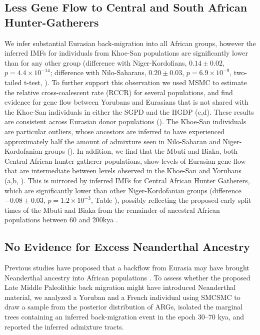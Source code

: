 \subsection{Less Gene Flow to Central and South African Hunter-Gatherers} We infer substantial Eurasian back-migration into all African groups, however the inferred IMFs for individuals from Khoe-San populations are significantly lower than for any other group (difference with Niger-Kordofians, $0.14 \pm 0.02$, $p = 4.4 \times 10^{-14}$; difference with Nilo-Saharans, $0.20 \pm 0.03$, $p = 6.9 \times 10^{-9}$, two-tailed t-test, ). To further support this observation we used MSMC to estimate the relative cross-coalescent rate (RCCR) for several populations, and find evidence for gene flow between Yorubans and Eurasians that is not shared with the Khoe-San individuals in either the SGPD and the HGDP (c,d). These results are consistent across Eurasian donor populations (). The Khoe-San individuals are particular outliers, whose ancestors are inferred to have experienced approximately half the amount of admixture seen in Nilo-Saharan and Niger-Kordofanian groups (). 
In addition, we find that the Mbuti and Biaka, both Central African hunter-gatherer populations, show levels of Eurasian gene flow that are intermediate between levels observed in the Khoe-San and Yorubans (a,b, ).  This is mirrored by inferred IMFs for Central African Hunter Gatherers, which are significantly lower than other Niger-Kordofanian groups (difference $-0.08 \pm 0.03$, $p = 1.2 \times 10^{-3}$, Table ), possibly reflecting the proposed early split times of the Mbuti and Biaka from the remainder of ancestral African populations between 60 and 200kya \cite{Patin2017, Lipson2019}. 

\subsection{No Evidence for Excess Neanderthal Ancestry} Previous studies have proposed that a backflow from Eurasia may have brought Neanderthal ancestry into African populations \cite{Chen2020}. To assess whether the proposed Late Middle Paleolithic back migration might have introduced Neanderthal material, we analyzed a Yoruban and a French individual using SMCSMC to draw a sample from the posterior distribution of ARGs, isolated the marginal trees containing an inferred back-migration event in the epoch $30$--$70$ \gls{kya}, and reported the inferred admixture tracts. 

